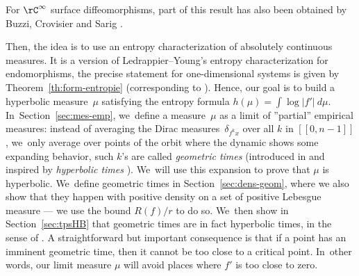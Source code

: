 For $\rC^{\infty}$ surface diffeomorphisms, part of this result has also been obtained by Buzzi, Crovisier and Sarig \cite{Buzzi_Crovisier_Sarig_2022}.

Then, the idea is to use an entropy characterization of absolutely continuous measures. It is a version of Ledrappier--Young's entropy characterization \cite{Ledrappier_Young_1985a,Ledrappier_Young_1985b} for endomorphisms, the precise statement for one-dimensional systems is given by Theorem~\ref{th:form-entropie} (corresponding to \cite[Th.\,VII.1.1]{SETE}).
Hence, our goal is to build a hyperbolic measure~$\mu$ satisfying the entropy formula $h(\mu) = \int \log |f'| \: d \mu$. In~Section~\ref{sec:mes-emp}, we~define a measure~$\mu$ as a limit of ''partial'' empirical measures: instead of averaging the Dirac measures~$\delta_{f^k x}$ over all $k$ in $[\![ 0, n-1 ]\!]$, we~only average over points of the orbit where the dynamic shows some expanding behavior, such $k$'s are called \textit{geometric times} (introduced in \cite{MR4701884} and inspired by \textit{hyperbolic times} \cite{Alves2000}). We~will use this expansion to prove that $\mu$ is hyperbolic. We~define geometric times in Section~\ref{sec:dens-geom}, where we also show that they happen with positive density on a set of positive Lebesgue measure --- we use the bound $R(f) / r$ to do so. We~then show in Section~\ref{sec:tpsHB} that geometric times are in fact hyperbolic times, in the sense of \cite{Alves2000}. A straightforward but important consequence is that if a point has an imminent geometric time, then it cannot be too close to a critical point. In~other words, our limit measure $\mu$ will avoid places where $f'$ is too close to zero.


